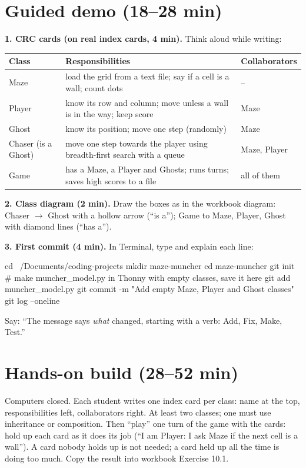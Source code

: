 \section{Guided demo (18--28 min)}
\begin{workedexample}
\textbf{1. CRC cards (on real index cards, 4 min).} Think aloud while writing:
\begin{center}\small
\begin{tabular}{@{}p{2.2cm}p{6.4cm}p{3.6cm}@{}}
\toprule
\textbf{Class} & \textbf{Responsibilities} & \textbf{Collaborators}\\ \midrule
Maze & load the grid from a text file; say if a cell is a wall; count dots & -- \\
Player & know its row and column; move unless a wall is in the way; keep score & Maze \\
Ghost & know its position; move one step (randomly) & Maze \\
Chaser (is a Ghost) & move one step towards the player using breadth-first search with a queue & Maze, Player \\
Game & has a Maze, a Player and Ghosts; runs turns; saves high scores to a file & all of them \\
\bottomrule
\end{tabular}
\end{center}
\textbf{2. Class diagram (2 min).} Draw the boxes as in the workbook diagram: Chaser $\rightarrow$ Ghost with a hollow arrow (\enquote{is a}); Game to Maze, Player, Ghost with diamond lines (\enquote{has a}).

\textbf{3. First commit (4 min).} In Terminal, type and explain each line:
\begin{shellcode}
cd ~/Documents/coding-projects
mkdir maze-muncher
cd maze-muncher
git init
# make muncher_model.py in Thonny with empty classes, save it here
git add muncher_model.py
git commit -m "Add empty Maze, Player and Ghost classes"
git log --oneline
\end{shellcode}
Say: \enquote{The message says \emph{what} changed, starting with a verb: Add, Fix, Make, Test.}
\end{workedexample}

\section{Hands-on build (28--52 min)}
\begin{unplugged}
Computers closed. Each student writes one index card per class: name at the top, responsibilities left, collaborators right. At least two classes; one must use inheritance or composition. Then \enquote{play} one turn of the game with the cards: hold up each card as it does its job (\enquote{I am Player: I ask Maze if the next cell is a wall}). A card nobody holds up is not needed; a card held up all the time is doing too much. Copy the result into workbook Exercise 10.1.
\end{unplugged}


